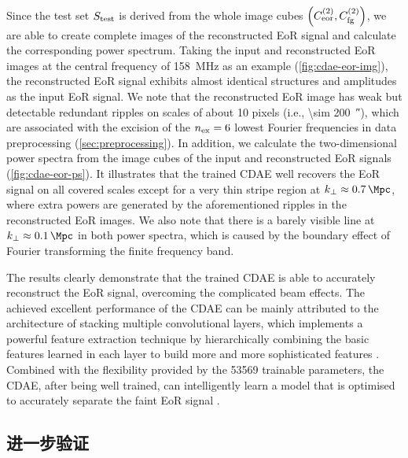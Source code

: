 Since the test set $S_{\mathrm{test}}$ is derived from the whole image cubes
$\left( C_{\mathrm{eor}}^{(2)}, C_{\mathrm{fg}}^{(2)} \right)$, we are able to create
complete images of the reconstructed EoR signal and calculate the
corresponding power spectrum.
Taking the input and reconstructed EoR images at the central frequency of
\SI{158}{\MHz} as an example (\autoref{fig:cdae-eor-img}), the reconstructed EoR
signal exhibits almost identical structures and amplitudes as the input EoR
signal.
We note that the reconstructed EoR image has weak but detectable redundant
ripples on scales of about 10 pixels (i.e., \SI{\sim 200}{\arcsecond}),
which are associated with the excision of the $n_{\mathrm{ex}} = 6$ lowest
Fourier frequencies in data preprocessing (\autoref{sec:preprocessing}).
In addition, we calculate the two-dimensional power spectra from the image
cubes of the input and reconstructed EoR signals (\autoref{fig:cdae-eor-ps}).
It illustrates that the trained CDAE well recovers the EoR signal on all
covered scales except for a very thin stripe region at
$\kperp \approx \SI{0.7}{\per\Mpc}$, where extra powers are generated
by the aforementioned ripples in the reconstructed EoR images.
We also note that there is a barely visible line at
$\kperp \approx \SI{0.1}{\per\Mpc}$ in both power spectra, which is
caused by the boundary effect of Fourier transforming the finite frequency
band.

The results clearly demonstrate that the trained CDAE is able to accurately
reconstruct the EoR signal, overcoming the complicated beam effects.
The achieved excellent performance of the CDAE can be mainly attributed
to the architecture of stacking multiple convolutional layers, which
implements a powerful feature extraction technique by hierarchically
combining the basic features learned in each layer to build more and
more sophisticated features \cite{leCun2015}.
Combined with the flexibility provided by the \num{53569} trainable
parameters, the CDAE, after being well trained, can intelligently learn a
model that is optimised to accurately separate the faint EoR signal
\cite{domingos2012}.

\subsection{进一步验证}
\label{sec:cdae-validation}

